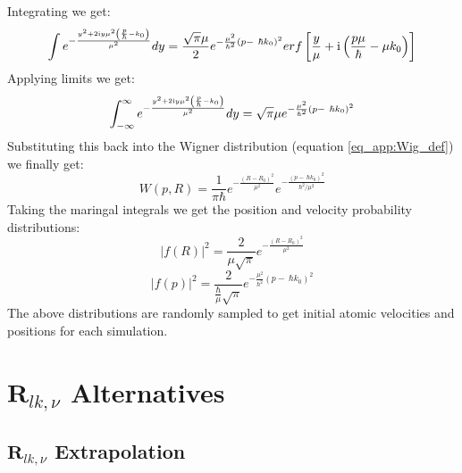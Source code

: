Integrating we get:
\begin{equation}
  \int e^{-\frac{y^2 + 2 \mathrm{i} y\mu^{2}\left( \frac{p}{\hbar} - k_0\right)}{\mu^{2}}  } dy = \frac{\sqrt{\pi} \mu}{2} e^{-\frac{\mu^2}{\hbar^2} (p - \ \hbar k_0)^2} erf\left[\frac{y}{\mu} + \mathrm{i} \left(\frac{p \mu}{\hbar} - \mu k_0 \right)\right]
   \label{eq_app:step4}
\end{equation}
Applying limits we get:
\begin{equation}
  \int_{-\infty}^{\infty} e^{-\frac{y^2 + 2 \mathrm{i} y\mu^{2}\left( \frac{p}{\hbar} - k_0\right)}{\mu^{2}}  } dy = \sqrt{\pi} \mu e^{-\frac{\mu^2}{\hbar^2} \left(p - \ \hbar k_0 \right)^2}
  \label{eq_app:step5}
\end{equation}
Substituting this back into the Wigner distribution (equation \eqref{eq_app:Wig_def}) we finally get:
\begin{equation}
  W(p, R) = \frac{1}{\pi \hbar} e^{-\frac{(R - R_0)^2}{\mu^2}} e^{-\frac{\left(p - \ \hbar k_0 \right)^2}{\hbar^2/\mu^2}}
  \label{eq_app:step6}
\end{equation}
Taking the maringal integrals we get the position and velocity probability distributions:
\begin{equation}
  \vert f(R)\vert^2 = \frac{2}{\mu \sqrt{\pi}} e^{- \frac{(R - R_0)^2}{\mu^2}}
\end{equation}
\begin{equation}
  \vert f(p)\vert^2 = \frac{2}{\frac{\hbar}{\mu} \sqrt{\pi}} e^{- \frac{\mu^2}{\hbar^2}(p - \ \hbar k_0)^2}
\end{equation}
The above distributions are randomly sampled to get initial atomic velocities and positions for each simulation.

\chapter{$\mathbf{R}_{lk, \nu}$ Alternatives}
\label{ap:RlkAlternatives}
\section{$\mathbf{R}_{lk, \nu}$ Extrapolation}
\label{ap:RlkExtrap}


